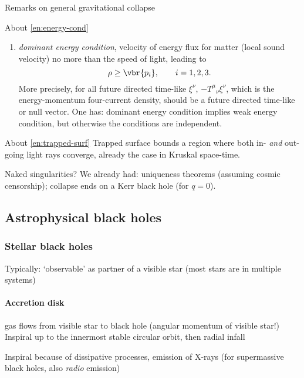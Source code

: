 \begin{namedrem}{Remarks on general gravitational collapse}
\begin{namedrem}{About \cref{en:energy-cond}}
\begin{enumerate}[label=\alph*]
\item \emph{dominant energy condition}, velocity of energy flux for matter
(local sound velocity) no more than the speed of light, leading to
\begin{equation}
\rho \ge \vbr{p_i},\qquad i = 1, 2, 3.
\end{equation}
More precisely, for all future directed time-like $\xi^\nu$, $-T^\mu{}_\nu
\xi^\nu$, which is the energy-momentum four-current density, should be a future
directed time-like or null vector. One has: dominant energy condition implies
weak energy condition, but otherwise the conditions are independent.

\end{enumerate}
\end{namedrem} %

\begin{namedrem}{About \cref{en:trapped-surf}}
Trapped surface bounds a region where both in- \emph{and} out-going light rays
converge, already the case in Kruskal space-time.
\end{namedrem} %

Naked singularities? We already had: uniqueness theorems (assuming cosmic
censorship); collapse ends on a Kerr black hole (for $q = 0$).

\end{namedrem} %
\subsection{Astrophysical black holes}

\subsubsection{Stellar black holes}
Typically: `observable' as partner of a visible star (most stars are in multiple
systems)

\paragraph{Accretion disk} gas flows from visible star to black hole (angular
momentum of visible star!) Inspiral up to the innermost stable circular orbit,
then radial infall

Inspiral because of dissipative processes, emission of X-rays (for supermassive
black holes, also \emph{radio} emission)

